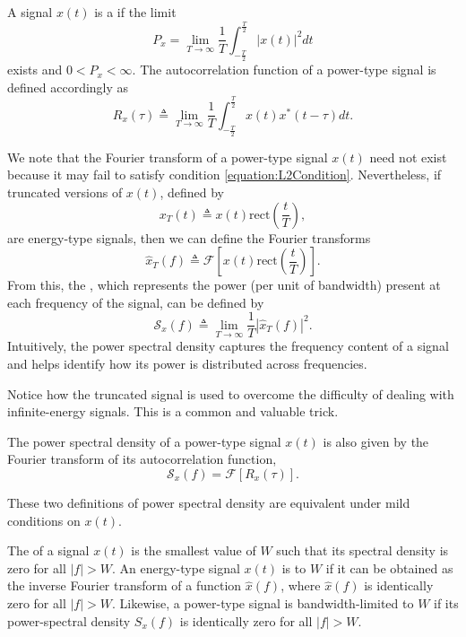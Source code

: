 A signal $x(t)$ is a  if the limit
\[ P_x = \lim_{T\rightarrow\infty} \frac{1}{T} \int_{-\frac{T}{2}}^{\frac{T}{2}} | x(t) |^2 dt \]
exists and $0 < P_x < \infty$.
The autocorrelation function of a power-type signal is defined accordingly as
\begin{equation*}
R_x(\tau) \triangleq  \lim_{T\rightarrow\infty} \frac{1}{T} \int_{-\frac{T}{2}}^{\frac{T}{2}} x(t)x^*(t - \tau) dt .
\end{equation*}

We note that the Fourier transform of a power-type signal $x(t)$ need not exist because it may fail to satisfy condition \eqref{equation:L2Condition}.
Nevertheless, if truncated versions of $x(t)$, defined by
\begin{equation*}
x_T(t) \triangleq x(t) \mathrm{rect} \left( \frac{t}{T} \right) ,
\end{equation*}
are energy-type signals, then we can define the Fourier transforms
\begin{equation*}
\hat{x}_T(f) \triangleq \mathcal{F} \left[ x(t) \mathrm{rect} \left( \frac{t}{T} \right) \right] .
\end{equation*}
From this, the , which represents the power (per unit of bandwidth) present at each frequency of the signal, can be defined by
\begin{equation*}
\mathcal{S}_x(f) \triangleq \lim_{T \rightarrow \infty} \frac{1}{T} |\hat{x}_T(f)|^2 .
\end{equation*}
Intuitively, the power spectral density captures the frequency content of a signal and helps identify how its power is distributed across frequencies.

Notice how the truncated signal is used to overcome the difficulty of dealing with infinite-energy signals.
This is a common and valuable trick.

\begin{definition}
The power spectral density of a power-type signal $x(t)$ is also given by the Fourier transform of its autocorrelation function,
\begin{equation*}
\mathcal{S}_x (f) = \mathcal{F} [ R_x (\tau) ].
\end{equation*}
\end{definition}
These two definitions of power spectral density are equivalent under mild conditions on $x(t)$.

The  of a signal $x(t)$ is the smallest value of $W$ such that its spectral density is zero for all $|f| > W$.
An energy-type signal $x(t)$ is  to $W$ if it can be obtained as the inverse Fourier transform of a function $\hat{x}(f)$, where $\hat{x}(f)$ is identically zero for all $|f| > W$.
Likewise, a power-type signal is bandwidth-limited to $W$ if its power-spectral density $S_x (f)$ is identically zero for all $|f| > W$.

